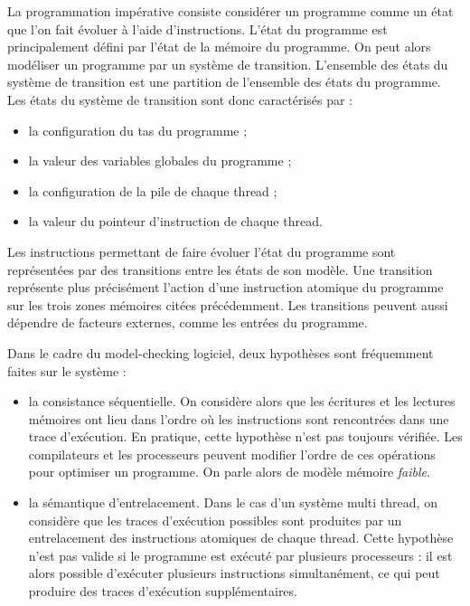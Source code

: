 La programmation impérative consiste considérer un programme comme un état que
l'on fait évoluer à l'aide d'instructions. L'état du programme est
principalement défini par l'état de la mémoire du programme.
On peut alors modéliser un programme par un système de transition. L'ensemble
des états du système de transition est une partition de l'ensemble des états du
programme. Les états du système de transition sont donc caractérisés par :

\begin{itemize}
\item
  la configuration du tas du programme ;
\item
  la valeur des variables globales du programme ;
\item
  la configuration de la pile de chaque thread ;
\item
  la valeur du pointeur d'instruction de chaque thread.
\end{itemize}

Les instructions permettant de faire évoluer l'état du programme sont
représentées par des transitions entre les états de son modèle. Une transition
représente plus précisément l'action d'une instruction atomique du programme sur
les trois zones mémoires citées précédemment. Les transitions peuvent aussi
dépendre de facteurs externes, comme les entrées du programme.

Dans le cadre du model-checking logiciel, deux hypothèses sont fréquemment
faites sur le système :

\begin{itemize}
\item
  la consistance séquentielle. On considère alors que les écritures et
  les lectures mémoires ont lieu dans l'ordre où les instructions sont
  rencontrées dans une trace d'exécution. En pratique, cette hypothèse
  n'est pas toujours vérifiée. Les compilateurs et les processeurs
  peuvent modifier l'ordre de ces opérations pour optimiser un
  programme. On parle alors de modèle mémoire \emph{faible}.
\item
  la sémantique d'entrelacement. Dans le cas d'un système multi thread,
  on considère que les traces d'exécution possibles sont produites par
  un entrelacement des instructions atomiques de chaque thread. Cette
  hypothèse n'est pas valide si le programme est exécuté par plusieurs
  processeurs : il est alors possible d'exécuter plusieurs instructions
  simultanément, ce qui peut produire des traces d'exécution
  supplémentaires.
\end{itemize}


